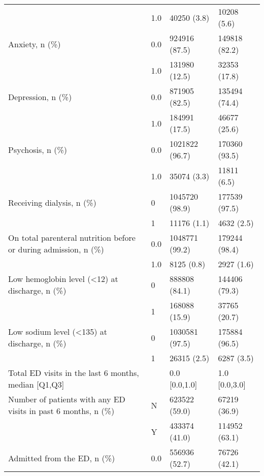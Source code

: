\begin{tabular}{llll}
                                       & 1.0 &                    40250 (3.8) &        10208 (5.6) \\
Anxiety, n (\%) & 0.0 &                  924916 (87.5) &      149818 (82.2) \\
                                       & 1.0 &                  131980 (12.5) &       32353 (17.8) \\
Depression, n (\%) & 0.0 &                  871905 (82.5) &      135494 (74.4) \\
                                       & 1.0 &                  184991 (17.5) &       46677 (25.6) \\
Psychosis, n (\%) & 0.0 &                 1021822 (96.7) &      170360 (93.5) \\
                                       & 1.0 &                    35074 (3.3) &        11811 (6.5) \\
Receiving dialysis, n (\%) & 0 &                 1045720 (98.9) &      177539 (97.5) \\
                                       & 1 &                    11176 (1.1) &         4632 (2.5) \\
On total parenteral nutrition before or during admission, n (\%) & 0.0 &                 1048771 (99.2) &      179244 (98.4) \\
                                       & 1.0 &                     8125 (0.8) &         2927 (1.6) \\
Low hemoglobin level (<12) at discharge, n (\%) & 0 &                  888808 (84.1) &      144406 (79.3) \\
                                       & 1 &                  168088 (15.9) &       37765 (20.7) \\
Low sodium level (<135) at discharge, n (\%) & 0 &                 1030581 (97.5) &      175884 (96.5) \\
                                       & 1 &                    26315 (2.5) &         6287 (3.5) \\
Total ED visits in the last 6 months, median [Q1,Q3] &   &                  0.0 [0.0,1.0] &      1.0 [0.0,3.0] \\
Number of patients with any ED visits in past 6 months, n (\%) & N &                  623522 (59.0) &       67219 (36.9) \\
                                       & Y &                  433374 (41.0) &      114952 (63.1) \\
Admitted from the ED, n (\%) & 0.0 &                  556936 (52.7) &       76726 (42.1) \\

\end{tabular}
